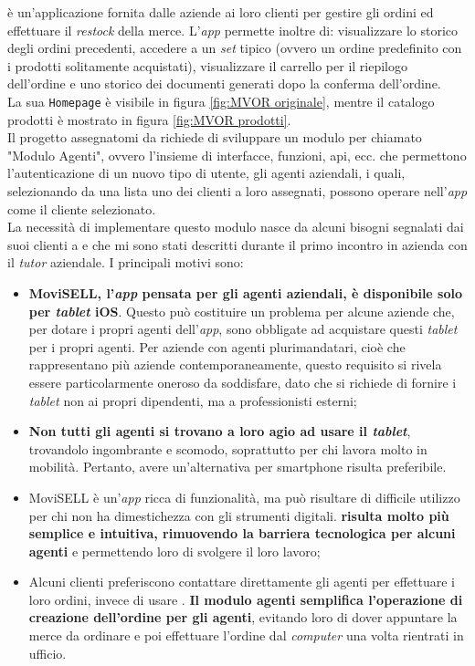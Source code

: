 {\movi} è un'applicazione fornita dalle aziende ai loro clienti per gestire gli ordini ed effettuare il \textit{restock} della merce. 
L'\textit{app} permette inoltre di: visualizzare lo 
storico degli ordini precedenti, accedere a un \textit{set} tipico (ovvero un ordine predefinito con i prodotti solitamente 
acquistati), visualizzare il carrello per il riepilogo dell'ordine e uno storico dei 
documenti generati dopo la conferma dell'ordine.\\
La sua 
\texttt{Homepage} è visibile in figura \ref{fig:MVOR originale}, mentre il catalogo prodotti è mostrato in figura 
\ref{fig:MVOR prodotti}.\\
Il progetto assegnatomi da {\company} richiede di sviluppare un modulo per {\movi} chiamato "Modulo Agenti", ovvero 
l'insieme di interfacce, funzioni, \gls{api}, ecc. che permettono l'autenticazione di un nuovo tipo di utente, gli agenti aziendali, 
i quali, selezionando da una lista uno dei clienti a loro assegnati, possono operare nell'\textit{app} come il cliente selezionato.\\
La necessità di implementare questo modulo nasce da alcuni bisogni segnalati dai suoi clienti a {\company} e che 
mi sono stati descritti durante il primo incontro in azienda con il \textit{tutor} aziendale. I principali motivi sono:
\begin{itemize}
    \item \textbf{MoviSELL, l'\textit{app} pensata per gli agenti aziendali, è disponibile solo per \textit{tablet} iOS}. Questo può costituire un problema 
          per alcune aziende che, per dotare i propri agenti dell'\textit{app}, sono obbligate ad acquistare questi \textit{tablet} per i propri agenti. 
          Per aziende con agenti plurimandatari, cioè che rappresentano più aziende contemporaneamente, questo requisito si 
          rivela essere particolarmente oneroso da soddisfare, dato che si richiede di fornire i \textit{tablet} non ai propri dipendenti, 
          ma a professionisti esterni;
    \item \textbf{Non tutti gli agenti si trovano a loro agio ad usare il \textit{tablet}}, trovandolo ingombrante e scomodo, soprattutto per chi 
          lavora molto in mobilità. Pertanto, avere un'alternativa per smartphone risulta preferibile.
    \item MoviSELL è un'\textit{app} ricca di funzionalità, ma può risultare di difficile utilizzo per chi non ha dimestichezza con gli 
          strumenti digitali. \textbf{{\movi} risulta molto più semplice e intuitiva, rimuovendo la barriera tecnologica per alcuni 
          agenti} e permettendo loro di svolgere il loro lavoro;
    \item Alcuni clienti preferiscono contattare direttamente gli agenti per effettuare i loro ordini, invece di usare {\movi}. 
          \textbf{Il modulo agenti semplifica l'operazione di creazione dell'ordine per gli agenti}, evitando loro di dover appuntare 
          la merce da ordinare e poi effettuare l'ordine dal \textit{computer} una volta rientrati in ufficio.
\end{itemize}